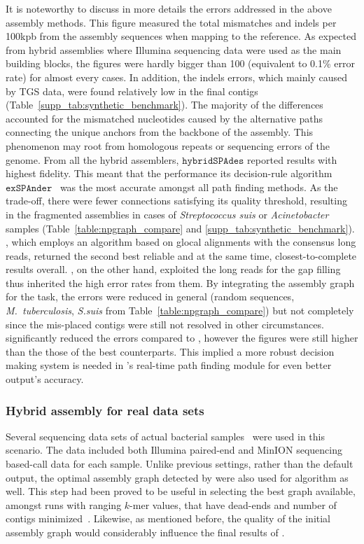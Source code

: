 It is noteworthy to discuss in more details the errors addressed in the above assembly methods.
This figure measured the total mismatches and indels per 100kpb from the assembly sequences when mapping to the reference.
As expected from hybrid assemblies where Illumina sequencing data were used as the main building blocks, the figures were hardly bigger than 100 (equivalent to 0.1\% error rate) for almost every cases.
In addition, the indels errors, which mainly caused by TGS data, were found relatively low in the final contigs (Table~\ref{supp_tab:synthetic_benchmark}).
The majority of the differences accounted for the mismatched nucleotides caused by the alternative paths connecting the unique anchors from the backbone of the assembly.
This phenomenon may root from homologous repeats or sequencing errors of the genome.
From all the hybrid assemblers, $\mathtt{hybridSPAdes}$ reported results with highest fidelity. This meant that the performance its decision-rule algorithm $\mathtt{exSPAnder}$~\cite{Prjibelski2014} was the most accurate amongst all path finding methods. As the trade-off, there were fewer connections satisfying its quality threshold, resulting in the fragmented assemblies in cases of \emph{Streptococcus suis} or \emph{Acinetobacter} samples (Table~\ref{table:npgraph_compare} and \ref{supp_tab:synthetic_benchmark}).
\unicycler{}, which employs an algorithm based on glocal alignments with the consensus long reads, returned the second best reliable and at the same time, closest-to-complete results overall.
\npscarf{}, on the other hand, exploited the long reads for the gap filling thus inherited the high error rates from them.
By integrating the assembly graph for the task, the errors were reduced in general (random sequences, \emph{M.~tuberculosis}, \emph{S.suis} from Table~\ref{table:npgraph_compare}) but not completely since the mis-placed contigs were still not resolved in other circumstances.
\npgraph{} significantly reduced the errors compared to \npscarf{}, however the figures were still higher than the those of the best counterparts.
This implied a more robust decision making system is needed in \npgraph{}'s real-time path finding module for even better output's accuracy.

\subsubsection{Hybrid assembly for real data sets}
Several sequencing data sets of actual bacterial samples~\cite{George2017M14} were used in this scenario.
The data included both Illumina paired-end and MinION sequencing based-call data for each sample.
Unlike previous settings, rather than the default output, the optimal \spades{} assembly graph detected by \unicycler{} were also used for \npgraph{} algorithm as well.
This step had been proved to be useful in selecting the best graph available, amongst \spades{} runs with ranging $k$-mer values, that have dead-ends and number of contigs minimized~\cite{Wick2017unicycler}. Likewise, as mentioned before, the quality of the initial assembly graph would considerably influence the final results of \npgraph{}. 

